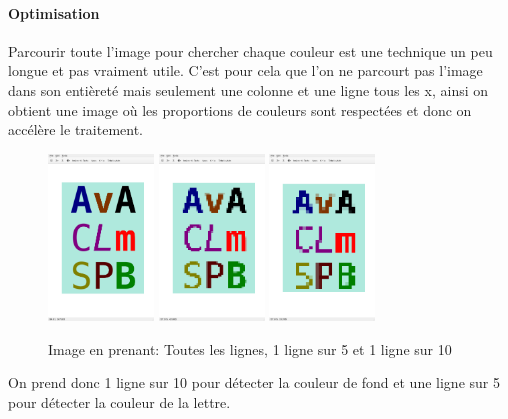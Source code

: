 \documentclass[a4paper,12pt,titlepage]{report}
\begin{document}
	\paragraph{Optimisation}
	Parcourir toute l'image pour chercher chaque couleur est une technique un peu longue et pas vraiment utile. C'est pour cela que l'on ne parcourt pas l'image dans son entièreté mais seulement une colonne et une ligne tous les x, ainsi on obtient une image où les proportions de couleurs sont respectées et donc on accélère le traitement.
	\begin{figure}[h]
	\centering
		\includegraphics[width=0.25\textwidth]{../illus/1s1.png}
		\includegraphics[width=0.25\textwidth]{../illus/1s5.png}
		\includegraphics[width=0.25\textwidth]{../illus/1s10.png}
		\caption{Image en prenant: Toutes les lignes, 1 ligne sur 5 et 1 ligne sur 10}
	\end{figure}
	On prend donc 1 ligne sur 10 pour détecter la couleur de fond et une ligne sur 5 pour détecter la couleur de la lettre.
\end{document}
